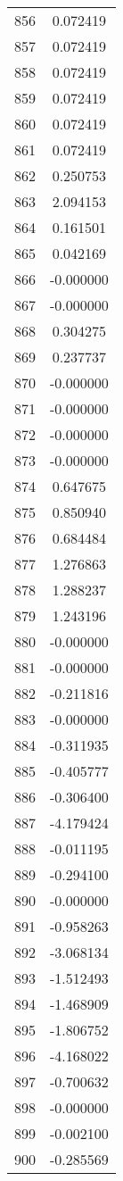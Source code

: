 \documentclass[12pt]{article}
\begin{document}
\begin{longtable}{@{}cc@{}}
856 & 0.072419 \\
857 & 0.072419 \\
858 & 0.072419 \\
859 & 0.072419 \\
860 & 0.072419 \\
861 & 0.072419 \\
862 & 0.250753 \\
863 & 2.094153 \\
864 & 0.161501 \\
865 & 0.042169 \\
866 & -0.000000 \\
867 & -0.000000 \\
868 & 0.304275 \\
869 & 0.237737 \\
870 & -0.000000 \\
871 & -0.000000 \\
872 & -0.000000 \\
873 & -0.000000 \\
874 & 0.647675 \\
875 & 0.850940 \\
876 & 0.684484 \\
877 & 1.276863 \\
878 & 1.288237 \\
879 & 1.243196 \\
880 & -0.000000 \\
881 & -0.000000 \\
882 & -0.211816 \\
883 & -0.000000 \\
884 & -0.311935 \\
885 & -0.405777 \\
886 & -0.306400 \\
887 & -4.179424 \\
888 & -0.011195 \\
889 & -0.294100 \\
890 & -0.000000 \\
891 & -0.958263 \\
892 & -3.068134 \\
893 & -1.512493 \\
894 & -1.468909 \\
895 & -1.806752 \\
896 & -4.168022 \\
897 & -0.700632 \\
898 & -0.000000 \\
899 & -0.002100 \\
900 & -0.285569 \\

\end{longtable}
\end{document}
